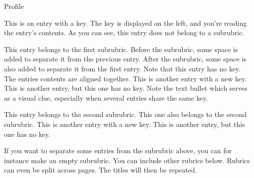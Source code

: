 \begin{rubric}{Profile}

\entry*[A Key]
  This is an entry with a key. The key is displayed on the left,
  and you're reading the entry's contents. As you can see, this entry does
  not belong to a subrubric.


\entry*[A Key]
  This entry belongs to the first subrubric. Before the subrubric,
  some space is added to separate it from the previous entry.
\entry*
  After the subrubric, some space is also added to separate it from the
  first entry. Note that this entry has no key. The entries contents are
  aligned together.
  This is another entry with a new key.
\entry*
  This is another entry, but this one has no key. Note the text bullet
  which serves as a visual clue, especially when several entries share the
  same key.


\entry*[A Key]
  This entry belongs to the second subrubric.
\entry*
  This one also belongs to the second subrubric.
  This is another entry with a new key.
\entry*
  This is another entry, but this one has no key.

    \subrubric{}

\entry*[A Key]
  If you want to separate some entries from the subrubric above,
  you can for instance make an empty subrubric.
\entry*
  You can include other rubrics below. Rubrics can even be split across
  pages. The titles will then be repeated.

\end{rubric}
